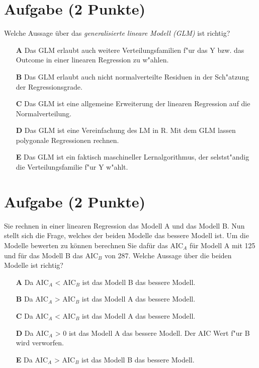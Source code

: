 \documentclass[a4paper, 10pt]{scrartcl}\usepackage[]{graphicx}\usepackage[]{xcolor}
\begin{document}
\section{Aufgabe \hfill (2 Punkte)}

Welche Aussage {\"u}ber das \textit{generalisierte lineare Modell (GLM)} ist richtig?  



\begin{enumerate}
\item [\textbf{A} \msquare] Das GLM erlaubt auch weitere Verteilungsfamilien f{"u}r das Y bzw. das Outcome in einer linearen Regression zu w{"a}hlen.
\item [\textbf{B} \msquare] Das GLM erlaubt auch nicht normalverteilte Residuen in der Sch{"a}tzung der Regressionsgrade.
\item [\textbf{C} \msquare] Das GLM ist eine allgemeine Erweiterung der linearen Regression auf die Normalverteilung.
\item [\textbf{D} \msquare] Das GLM ist eine Vereinfachung des LM in R. Mit dem GLM lassen polygonale Regressionen rechnen.
\item [\textbf{E} \msquare] Das GLM ist ein faktisch maschineller Lernalgorithmus, der selstst{"a}ndig die Verteilungsfamilie f{"u}r Y w{"a}hlt.
\end{enumerate}

\section{Aufgabe \hfill (2 Punkte)}



Sie rechnen in einer linearen Regression das Modell A und das Modell B. Nun
stellt sich die Frage, welches der beiden Modelle das bessere Modell
ist. Um die Modelle bewerten zu k{\"o}nnen berechnen Sie daf{\"u}r das AIC$_A$ f{\"u}r
Modell A mit 125 und f{\"u}r das Modell B das AIC$_B$ von
287. Welche Aussage {\"u}ber die beiden Modelle ist richtig?



\begin{enumerate}
\item [\textbf{A} \msquare] Da AIC$_A$ < AIC$_B$ ist das Modell B das bessere Modell.
\item [\textbf{B} \msquare] Da AIC$_A$ > AIC$_B$ ist das Modell A das bessere Modell.
\item [\textbf{C} \msquare] Da AIC$_A$ < AIC$_B$ ist das Modell A das bessere Modell.
\item [\textbf{D} \msquare] Da AIC$_A$ > 0 ist das Modell A das bessere Modell. Der AIC Wert f{"u}r B wird verworfen.
\item [\textbf{E} \msquare] Da AIC$_A$ > AIC$_B$ ist das Modell B das bessere Modell.
\end{enumerate}
\end{document}

